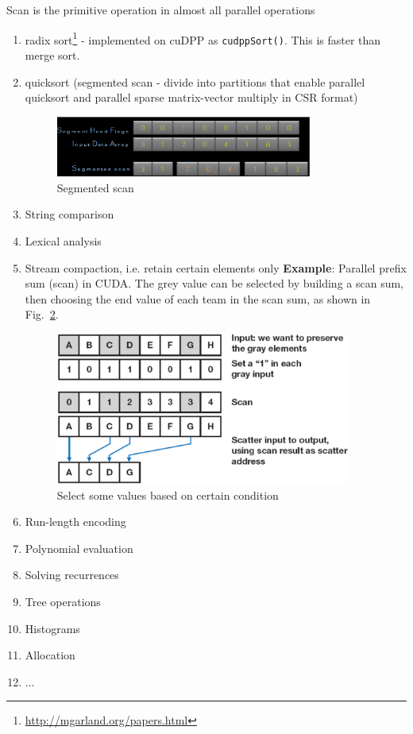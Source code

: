 Scan is the primitive operation in almost all parallel operations
\begin{enumerate}
\item radix
  sort\footnote{\url{http://mgarland.org/papers.html}}\citep{satish2009des}
  - implemented on cuDPP as \verb!cudppSort()!. This is faster than
  merge sort. 
\item quicksort (segmented scan - divide into partitions that enable
  parallel quicksort and parallel sparse matrix-vector multiply in CSR
  format) 
\begin{figure}[hbt]
  \centerline{\includegraphics[height=2cm,
    angle=0]{./images/segmented_scan.eps}}
\caption{Segmented scan}
\label{fig:segmented_scan}
\end{figure}

\item String comparison
\item Lexical analysis
\item Stream compaction, i.e. retain certain elements only
  {\bf Example}: Parallel prefix sum (scan) in
  CUDA\citep{harris2010pps}. The grey value can be selected by building a
  scan sum, then choosing the end value of each team in the scan sum,
  as shown in Fig.~\ref{fig:stream_compaction}.
\begin{figure}[hbt]
  \centerline{\includegraphics[height=5cm,
    angle=0]{./images/stream_compaction.eps}}
\caption{Select some values based on certain condition}
\label{fig:stream_compaction}
\end{figure}

\item Run-length encoding
\item Polynomial evaluation
\item Solving recurrences
\item Tree operations
\item Histograms
\item Allocation
\item ...
\end{enumerate}
